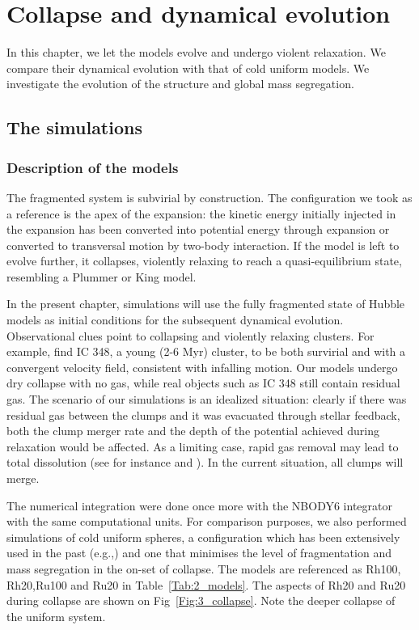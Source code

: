 

\chapter{Collapse and dynamical evolution}


In this chapter, we let the \HubLem models evolve and undergo violent relaxation. We compare their dynamical evolution with that of cold uniform models. We investigate the evolution of the structure and global mass segregation.

\minitoc

\section{The simulations}
\label{Sec:3_simulations}

\subsection{Description of the models}

The \HubLem fragmented system is subvirial by construction. The configuration we took as a reference is the apex of the expansion: the kinetic energy initially injected in the expansion has been converted into potential energy through expansion or converted to transversal motion by two-body interaction. If the model is left to evolve further, it collapses, violently relaxing to reach a quasi-equilibrium state, resembling a Plummer or King model.

In the present chapter, simulations will use the fully fragmented state of Hubble models as initial conditions for the subsequent dynamical evolution. Observational clues point to  collapsing and violently relaxing clusters. For example, \cite{Cottaar2015} find IC 348, a young (2-6 Myr) cluster, to be both survirial and with a convergent velocity field, consistent with infalling motion. Our models undergo dry collapse with no gas, while real objects such as IC 348 still contain residual gas. The scenario of our simulations is an idealized situation: clearly if there was residual gas between the clumps and it was evacuated through stellar feedback, both the clump merger rate and the depth of the potential achieved during relaxation would be affected. As a limiting case, rapid gas removal may lead to total dissolution (see for instance \citealt{Moeckel2012} and \citealt{Fujii2016}). In the current situation, all clumps will merge. 


The numerical integration were done once more with the NBODY6 integrator with the same computational units. For comparison purposes, we also performed simulations of cold uniform spheres, a configuration which has been extensively used  in the past (e.g.,\citealt{Theis1999,Boily2002,Barnes2009,Caputo2014,Benhaiem2015}) and one that minimises the level of fragmentation and mass segregation in the on-set of collapse. The models are referenced as Rh100, Rh20,Ru100 and Ru20 in Table~\ref{Tab:2_models}. The aspects of Rh20 and Ru20 during collapse are shown on Fig~\ref{Fig:3_collapse}. Note the deeper collapse of the uniform system.


